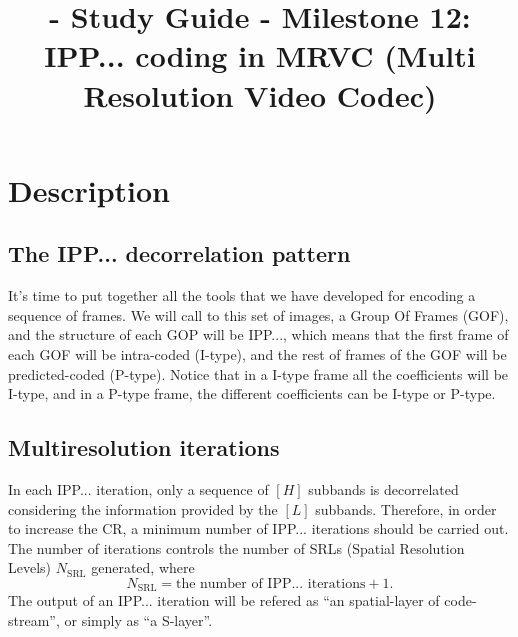 
\title{\SM{} - Study Guide - Milestone 12: IPP... coding in MRVC (Multi Resolution Video Codec)}

\maketitle

\section{Description}

\subsection{The IPP... decorrelation pattern}
It's time to put together all the tools that we have developed for
encoding a sequence of frames. We will call to this set of images, a
Group Of Frames (GOF), and the structure of each GOP will be IPP...,
which means that the first frame of each GOF will be intra-coded
(I-type), and the rest of frames of the GOF will be predicted-coded
(P-type). Notice that in a I-type frame all the coefficients will be
I-type, and in a P-type frame, the different coefficients can be
I-type or P-type.

\subsection{Multiresolution iterations}
In each IPP... iteration, only a sequence of $[H]$ subbands is
decorrelated considering the information provided by the $[L]$
subbands. Therefore, in order to increase the CR, a minimum number of
IPP... iterations should be carried out. The number of iterations
controls the number of SRLs (Spatial Resolution Levels)
$N_{\text{SRL}}$ generated, where
\begin{equation}
  N_{\text{SRL}} = \text{the number of IPP... iterations} + 1.
\end{equation}
The output of an IPP... iteration will be refered as ``an
spatial-layer of code-stream'', or simply as ``a S-layer''.

